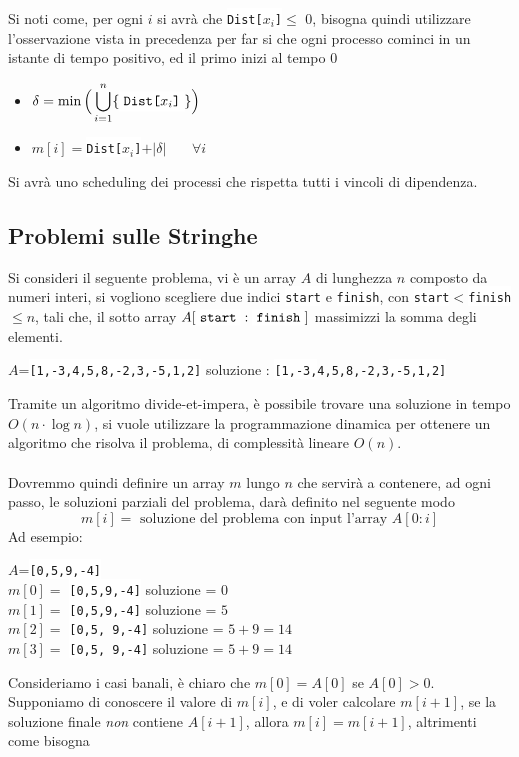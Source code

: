 \documentclass[12pt, letterpaper]{article}
\newcommand{\codeee}[1]{\colorbox{lg}{\texttt{#1}}}
\newcommand{\codee}[1]{\colorbox{white}{\texttt{#1}}}
\newcommand{\acc}{\\\hphantom{}\\}
\begin{document}
Si noti come, per ogni $i$ si avrà che \codee{Dist[$x_i$]}$\le$ 0, bisogna quindi utilizzare l'osservazione vista in precedenza per far 
si che ogni processo cominci in un istante di tempo positivo, ed il primo inizi al tempo 0\begin{itemize}
    \item $\delta = \min\Big(\displaystyle\bigcup_{i=1}^n\{\text{\codee{Dist[$x_i$]}}\}\Big)$
    \item $m[i]=$\codee{Dist[$x_i$]}$+|\delta|\;\;\;\;\,\;\;\forall i$
\end{itemize}
Si avrà uno scheduling dei processi che rispetta tutti i vincoli di dipendenza.
\subsection{Problemi sulle Stringhe}
Si consideri il seguente problema, vi è un array $A$ di lunghezza $n$ composto da numeri interi, si vogliono scegliere 
due indici \codee{start} e \codee{finish}, con \codee{start}$<$\codee{finish}$\le n$, tali che, il sotto 
array $A[\codee{start}:\codee{finish}]$ massimizzi la somma degli elementi. \begin{center}
    $A$=\codee{[1,-3,4,5,8,-2,3,-5,1,2]} soluzione : \codee{[1,-3,}\codeee{4,5,8,-2,3}\codee{,-5,1,2]}
\end{center}
Tramite un algoritmo divide-et-impera, è possibile trovare una soluzione in tempo $O(n\cdot\log{n})$, si vuole utilizzare 
la programmazione dinamica per ottenere un algoritmo che risolva il problema, di complessità lineare $O(n)$.\acc 
Dovremmo quindi definire un array $m$ lungo $n$ che servirà a contenere, ad ogni passo, le soluzioni parziali del problema, 
darà definito nel seguente modo $$m[i]=\text{ soluzione del problema con input l'array }A[0:i]$$
Ad esempio:\begin{center}
    $A$=\codee{[0,5,9,-4]}  \\ $m[0]=$ \codee{[0,5,9,-4]} soluzione = $0$ 
    \\ $m[1]=$ \codee{[0,}\codeee{5,}\codee{9,-4]} soluzione = $5$ \\  $m[2]=$ \codee{[0,}\codeee{5,  9}\codee{,-4]} soluzione = $5+9=14$ 
    \\ $m[3]=$ \codee{[0,}\codeee{5,  9}\codee{,-4]} soluzione = $5+9=14$
\end{center}
Consideriamo i casi banali, è chiaro che $m[0]=A[0]$ se $A[0]>0$. Supponiamo di conoscere il valore di $m[i]$, e di voler 
calcolare $m[i+1]$, se la soluzione finale \textit{non} contiene $A[i+1]$, allora $m[i]=m[i+1]$, altrimenti come bisogna 
\end{document}
